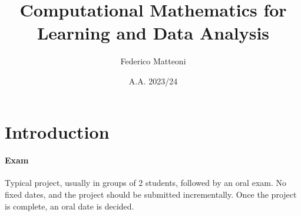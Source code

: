 \documentclass[10pt]{report}
\begin{document}
\title{Computational Mathematics for Learning and Data Analysis}
\author{Federico Matteoni}
\date{A.A. 2023/24}
\renewcommand*\contentsname{Index}

\maketitle
\tableofcontents
\pagebreak
\section{Introduction}
\paragraph{Exam} Typical project, usually in groups of 2 students, followed by an oral exam. No fixed dates, and the project should be submitted incrementally. Once the project is complete, an oral date is decided.
\end{document}
